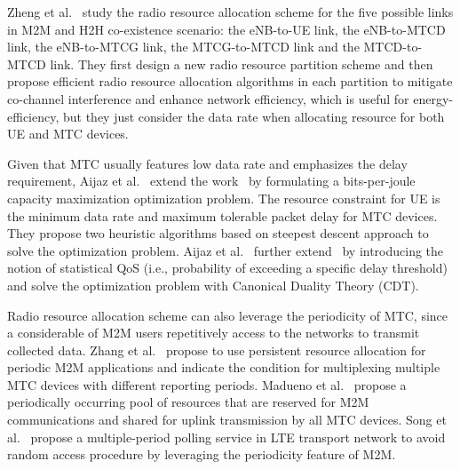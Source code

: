 Zheng et al.~\cite{KanZheng12} study the radio resource allocation scheme for the five possible links in M2M and H2H co-existence scenario: the eNB-to-UE link, the eNB-to-MTCD link, the eNB-to-MTCG link, the MTCG-to-MTCD link and the MTCD-to-MTCD link. They first design a new radio resource partition scheme and then propose efficient radio resource allocation algorithms in each partition to mitigate co-channel interference and enhance network efficiency, which is useful for energy-efficiency, but they just consider the data rate when allocating resource for both UE and MTC devices. 

Given that MTC usually features low data rate and emphasizes the delay requirement, Aijaz et al.~\cite{AijazA13} extend the work~\cite{KanZheng12} by formulating a bits-per-joule capacity maximization optimization problem. The resource constraint for UE is the minimum data rate and maximum tolerable packet delay for MTC devices. They propose two heuristic algorithms based on steepest descent approach to solve the optimization problem. Aijaz et al.~\cite{AijazTNCA14} further extend~\cite{AijazA13} by introducing the notion of statistical QoS (i.e., probability of exceeding a specific delay threshold) and solve the optimization problem with Canonical Duality Theory (CDT).

Radio resource allocation scheme can also leverage the periodicity of MTC, since a considerable of M2M users repetitively access to the networks to transmit collected data. Zhang et al.~\cite{Zhangy14} propose to use persistent resource allocation for periodic M2M applications and indicate the condition for multiplexing multiple MTC devices with different reporting periods. Madueno et al.~\cite{GCMadueno14} propose a periodically occurring pool of resources that are reserved for M2M communications and shared for uplink transmission by all MTC devices. Song et al.~\cite{qipeng2015an} propose a multiple-period polling service in LTE transport network to avoid random access procedure by leveraging the periodicity feature of M2M.

